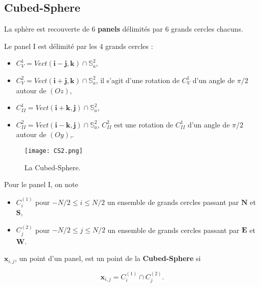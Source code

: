 \documentclass{sciposter}
\begin{document}
\vskip1cm
\begin{multicols}{3} 

\section*{Cubed-Sphere}

La sphère est recouverte de 6 \textbf{panels} délimités par 6 grands cercles chacuns.

Le panel I est délimité par les 4 grands cercles :
\begin{itemize}
\item $C_V^1 = Vect(\mathbf{i}-\mathbf{j}, \mathbf{k}) \cap \mathbb{S}_a^2$,
\item $C_V^2 = Vect(\mathbf{i}+\mathbf{j}, \mathbf{k}) \cap \mathbb{S}_a^2$, il s'agit d'une rotation de $C_V^1$ d'un angle de $\pi/2$ autour de $(Oz)$,
\item $C_{II}^1 = Vect(\mathbf{i}+\mathbf{k}, \mathbf{j}) \cap \mathbb{S}_a^2$,
\item $C_{II}^2 = Vect(\mathbf{i}-\mathbf{k}, \mathbf{j}) \cap \mathbb{S}_a^2$, $C_{II}^2$ est une rotation de $C_{II}^1$ d'un angle de $\pi/2$ autour de $(Oy)$,.
\end{itemize}

\begin{figure}
\begin{center}
\texttt{[image: CS2.png]}
\caption{La Cubed-Sphere.}
\end{center}
\end{figure}

Pour le panel I, on note 
\begin{itemize}
\item $C_i^{(1)}$ pour $-N/2 \leq i \leq N/2$ un ensemble de grands cercles passant par $\mathbf{N}$ et $\mathbf{S}$,
\item $C_j^{(2)}$ pour $-N/2 \leq j \leq N/2$ un ensemble de grands cercles passant par $\mathbf{E}$ et $\mathbf{W}$.
\end{itemize} 

$\mathbf{x}_{i,j}$, un point d'un panel, est un point de la \textbf{Cubed-Sphere} si 

\begin{equation}
\mathbf{x}_{i,j} = C_i^{(1)} \cap C_j^{(2)}.
\end{equation}


\begin{figure}[htbp]
\begin{center}
\end{center}
\end{figure}
\end{multicols}
\end{document}
